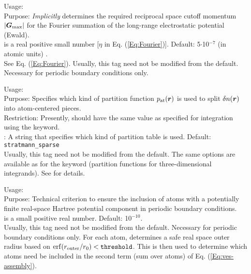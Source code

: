 {
  \noindent
  Usage: 
     \\[1.0ex]
  Purpose: \emph{Implicitly} determines the required reciprocal space
    cutoff momentum $|\mbox{\boldmath$G$}_\text{max}|$ for the Fourier summation of
    the long-range electrostatic potential (Ewald). \\[1.0ex]
   is a real positive small number [$\eta$ in
    Eq. (\ref{Eq:Fourier})]. Default: 5$\cdot$10$^{-7}$ (in atomic
    units) . \\
}
See Eq. (\ref{Eq:Fourier}). Usually, this tag need not be modified from the
default. Necessary for periodic boundary conditions only.  

{
  \noindent
  Usage:     \\[1.0ex]
  Purpose: Specifies which kind of partition function
    $p_\text{at}(\mbox{\boldmath$r$})$ is used to split $\delta n(\mbox{\boldmath$r$})$ into
    atom-centered pieces. \\[1.0ex] 
  Restriction: Presently,  should have the same
    value as specified for integration using the
   keyword. \\[1.0ex]
   : A string that specifies which kind of partition
    table is used. Default: \texttt{stratmann\_sparse} \\ 
}
Usually, this tag need not be modified from the default. The same
options are available as for the  keyword
(partition functions for three-dimensional integrands). See
   for details. 

{
  \noindent
  Usage:   \\[1.0ex]
  Purpose: Technical criterion to ensure the inclusion of atoms with a
    potentially finite real-space Hartree potential component in periodic
    boundary conditions.  \\[1.0ex]
   is a small positive real number. Default:
  10$^{-10}$. \\
}
Usually, this tag need not be modified from the default. Necessary for
periodic boundary conditions only. For each atom, determines a safe
real space outer radius based on $\mathop{\mathrm{erf}}(r_\text{outer}/r_0) <
\mathtt{threshold}$. This is then used to determine which atoms need
be included in the second term (sum over atoms) of
Eq. (\ref{Eq:ves-assembly}). 

